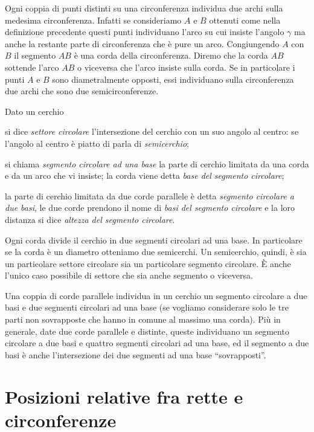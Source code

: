 Ogni coppia di punti distinti su una circonferenza individua due archi sulla medesima circonferenza. Infatti se consideriamo $A$ e $B$ ottenuti come nella definizione precedente questi punti individuano l'arco su cui insiste l'angolo $\gamma$ ma anche la restante parte di circonferenza che è pure un arco.
Congiungendo $A$ con $B$ il segmento $AB$ è una corda della circonferenza. Diremo che la corda $AB$ sottende l'arco $AB$ o viceversa che l'arco insiste sulla corda.
Se in particolare i punti $A$ e $B$ sono diametralmente opposti, essi individuano sulla circonferenza due archi che sono due semicirconferenze.

\begin{definizione}Dato un cerchio
\begin{itemize*}
\item si dice \emph{settore circolare} l'intersezione del cerchio con un suo angolo al centro: se l'angolo al centro è piatto di parla di \emph{semicerchio};
\item si chiama \emph{segmento circolare ad una base} la parte di cerchio limitata da una corda e da un arco che vi insiste; la corda viene detta \emph{base del segmento circolare};
\item la parte di cerchio limitata da due corde parallele è detta \emph{segmento circolare a due basi}, le due corde prendono il nome di \emph{basi del segmento circolare} e la loro distanza si dice \emph{altezza del segmento circolare}.
\end{itemize*}
\end{definizione}

Ogni corda divide il cerchio in due segmenti circolari ad una base. In particolare se la corda è un diametro otteniamo due semicerchi.
Un semicerchio, quindi, è sia un particolare settore circolare sia un particolare segmento circolare. \`E anche l'unico caso possibile di settore che sia anche segmento o viceversa.

Una coppia di corde parallele individua in un cerchio un segmento circolare a due basi e due segmenti circolari ad una base (se vogliamo considerare solo le tre parti non sovrapposte che hanno in comune al massimo una corda). Più in generale, date due corde parallele e distinte, queste individuano un segmento circolare a due basi e quattro segmenti circolari ad una base, ed il segmento a due basi è anche l'intersezione dei due segmenti ad una base ``sovrapposti''.

\section{Posizioni relative fra rette e circonferenze}

